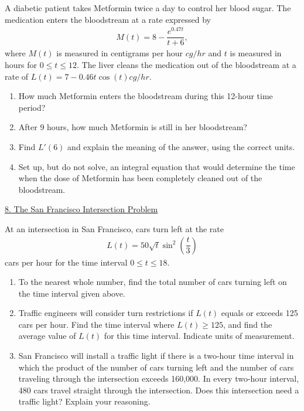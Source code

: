 A diabetic patient takes Metformin twice a day to control her blood sugar. The medication enters the bloodstream at a rate expressed by \begin{align*}
    M(t) = 8 - \dfrac{e^{0.47t}}{t + 6},
\end{align*}
where $M(t)$ is measured in centigrams per hour $\si{cg \per hr}$ and $t$ is measured in hours for $0 \leq t \leq 12$. The liver cleans the medication out of the bloodstream at a rate of $L(t) = 7 - 0.46t\cos (t) \si{cg \per hr}$. \\
\begin{enumerate}[label=\hspace{11pt}(\alph*), align=left, leftmargin=*, labelsep=0.25em]
    \item How much Metformin enters the bloodstream during this 12-hour time period?
    \item After 9 hours, how much Metformin is still in her bloodstream?
    \item Find $L'(6)$ and explain the meaning of the answer, using the correct units.
    \item Set up, but do not solve, an integral equation that would determine the time when the dose of Metformin has been completely cleaned out of the bloodstream.
\end{enumerate} \vspace{11pt}

\begin{center}
    \underline{8. The San Francisco Intersection Problem}
\end{center}

At an intersection in San Francisco, cars turn left at the rate \begin{align*}
    L(t) = 50\sqrt{t}\sin^2 \left(\dfrac{t}{3}\right)
\end{align*}
cars per hour for the time interval $0 \leq t \leq 18$. \\
\begin{enumerate}[label=\hspace{11pt}(\alph*), align=left, leftmargin=*, labelsep=0.25em]
    \item To the nearest whole number, find the total number of cars turning left on the time interval given above. \\
    \item Traffic engineers will consider turn restrictions if $L(t)$ equals or exceeds 125 cars per hour. Find the time interval where $L(t) \geq 125$, and find the average value of $L(t)$ for this time interval. Indicate units of measurement. \\
    \item San Francisco will install a traffic light if there is a two-hour time interval in which the product of the number of cars turning left and the number of cars traveling through the intersection exceeds 160,000. In every two-hour interval, 480 cars travel straight through the intersection. Does this intersection need a traffic light? Explain your reasoning.
\end{enumerate} \vspace{11pt}

